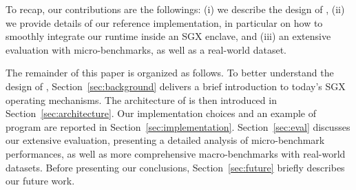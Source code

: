 
To recap, our contributions are the followings: (i) we describe the design of \SYS, (ii) we provide details of our reference implementation, in particular on how to smoothly integrate our runtime inside an SGX enclave, and (iii) an extensive evaluation with micro-benchmarks, as well as a real-world dataset.

The remainder of this paper is organized as follows.
To better understand the design of \SYS, Section~\ref{sec:background} delivers a brief introduction to today's SGX operating mechanisms.
The architecture of \SYS{} is then introduced in Section~\ref{sec:architecture}.
Our implementation choices and an example of \SYS{} program are reported in Section~\ref{sec:implementation}.
Section~\ref{sec:eval} discusses our extensive evaluation, presenting a detailed analysis of micro-benchmark performances, as well as more comprehensive macro-benchmarks with real-world datasets.%
Before presenting our conclusions, Section~\ref{sec:future} briefly describes our future work.
